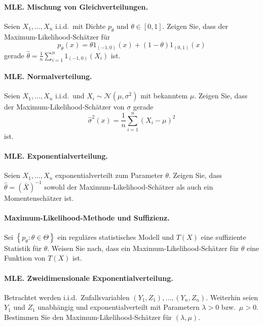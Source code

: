 \paragraph{MLE. Mischung von Gleichverteilungen.  }
Seien $X_1,\ldots,X_n$ i.i.d.\ mit Dichte $p_\theta$ 
und $\theta\in \left[ 0,1 \right]$. Zeigen Sie, dass der Maximum-Likelihood-Schätzer
für
\begin{equation*}
	p_\theta (x) = \theta 1_{\left( -1,0 \right)}(x) + \left( 1-\theta \right)1_{\left( 0,1 \right)}(x)
\end{equation*}
gerade $\hat \theta = \frac{1}{n} \sum_{i=1}^{n} 1_{(-1,0)}\left( X_i \right)$ ist.

\paragraph{MLE. Normalverteilung. }
Seien $X_1,\ldots,X_n$ i.i.d.\ und $X_i \sim \mathcal N\left( \mu, \sigma^2 \right)$ mit bekanntem $\mu$. 
Zeigen Sie, dass der Maximum-Likelihood-Schätzer von $\sigma$ gerade
\begin{equation*}
	\hat \sigma^2 (x) = \frac{1}{n} \sum_{i=1}^{n} (X_i - \mu)^2  
\end{equation*}
ist.

\paragraph{MLE. Exponentialverteilung. } Seien $X_1,\ldots,X_n$ exponentialverteilt
zum Parameter $\theta$. Zeigen Sie, dass $\hat \theta = (\bar X)^{-1}$ sowohl der 
Maximum-Likelihood-Schätzer als auch ein Momentenschätzer ist.

\paragraph{Maximum-Likelihood-Methode und Suffizienz.   }
Sei $\left\{ p_\theta : \theta\in\Theta \right\}$ ein reguläres statistisches
Modell und $T\left( X \right)$ eine suffiziente Statistik für $\theta$. 
Weisen Sie nach, dass ein Maximum-Likelihood-Schätzer für $\theta$ 
eine Funktion von $T\left( X \right)$ ist.


\paragraph{MLE. Zweidimensionale Exponentialverteilung. } Betrachtet werden 
i.i.d.\ Zufallsvariablen $(Y_1, Z_1), \ldots,(Y_n,Z_n)$. Weiterhin seien
$Y_1$ und $Z_1$ unabhängig und exponentialverteilt mit Parametern
$\lambda > 0$ bzw.\ $\mu > 0$. Bestimmen Sie den Maximum-Likelihood-Schätzer
für $(\lambda,\mu)$.

